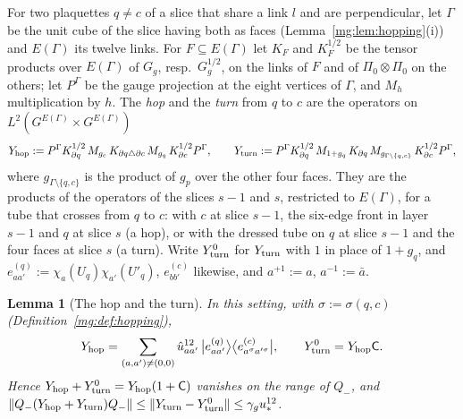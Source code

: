 \documentclass[11pt,a4paper]{article}
\newtheorem{lemma}[theorem]{Lemma}
\theoremstyle{definition}
\theoremstyle{remark}
\newcommand{\norm}[1]{\lVert #1\rVert}
\begin{document}
For two plaquettes $q\ne c$ of a slice that share a link $l$ and are perpendicular, let $\Gamma$ be the unit cube of the slice having both as faces
(Lemma~\ref{mg:lem:hopping}(i)) and $E(\Gamma)$ its twelve links. For $F\subseteq E(\Gamma)$ let $K_F$ and $K^{1/2}_F$ be the tensor products over $E(\Gamma)$ of
$G_g$, resp.\ $G_g^{1/2}$, on the links of $F$ and of $\Pi_0\otimes\Pi_0$ on the others; let $P^\Gamma$ be the gauge projection at the eight vertices of
$\Gamma$, and $M_h$ multiplication by $h$. The \emph{hop} and the \emph{turn} from $q$ to $c$ are the operators on $L^2(G^{E(\Gamma)}\times G^{E(\Gamma)})$
\begin{gather*}
Y_{\rm hop}:=P^\Gamma K^{1/2}_{\partial q}\,M_{g_c}\,K_{\partial q\triangle\partial c}\,M_{g_q}\,K^{1/2}_{\partial c}P^\Gamma,\qquad
Y_{\rm turn}:=P^\Gamma K^{1/2}_{\partial q}\,M_{1+g_q}\,K_{\partial q}\,M_{g_{\Gamma\setminus\{q,c\}}}\,K^{1/2}_{\partial c}P^\Gamma,
\end{gather*}
where $g_{\Gamma\setminus\{q,c\}}$ is the product of $g_p$ over the other four faces. They are the products of the operators of the slices $s-1$ and $s$, restricted
to $E(\Gamma)$, for a tube that crosses from $q$ to $c$: with $c$ at slice $s-1$, the six-edge front in layer $s-1$ and $q$ at slice $s$ (a hop), or with the dressed
tube on $q$ at slice $s-1$ and the four faces at slice $s$ (a turn). Write $Y^0_{\rm turn}$ for $Y_{\rm turn}$ with $1$ in place of $1+g_q$, and
$e^{(q)}_{aa'}:=\chi_a(U_q)\chi_{a'}(U'_q)$, $e^{(c)}_{bb'}$ likewise, and $a^{+1}:=a$, $a^{-1}:=\bar a$.

\begin{lemma}[The hop and the turn]\label{mg:lem:hopturn}
In this setting, with $\sigma:=\sigma(q,c)$ (Definition~\ref{mg:def:hopping}),
\[
Y_{\rm hop}=\sum_{(a,a')\ne(0,0)}\hat u_{aa'}^{12}\,\bigl|e^{(q)}_{aa'}\bigr\rangle\bigl\langle e^{(c)}_{a^\sigma a'^\sigma}\bigr|,\qquad Y^0_{\rm turn}=Y_{\rm hop}\mathsf C .
\]
Hence $Y_{\rm hop}+Y^0_{\rm turn}=Y_{\rm hop}(1+\mathsf C)$ vanishes on the range of $Q_-$, and
$\norm{Q_-(Y_{\rm hop}+Y_{\rm turn})Q_-}\le\norm{Y_{\rm turn}-Y^0_{\rm turn}}\le\gamma_gu_*^{12}$.
\end{lemma}
\end{document}
